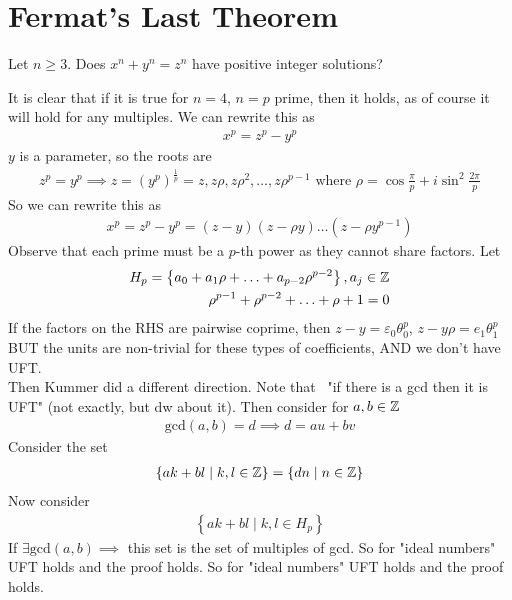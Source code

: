 \documentclass{memoir}
\begin{document}
\section{Fermat's Last Theorem}
\label{sec:fermat_s_last_theorem}
\begin{thm}
	Let \(n\geq 3\). Does \(x^{n}+y^{n}=z^{n}\) have positive integer solutions?
\end{thm}
It is clear that if it is true for \(n  = 4\), \(n= p\) prime, then it holds, as of course it will hold for any multiples. We can rewrite this as
\begin{align*}
	x^{p} = z^{p}-y^{p}
\end{align*}
\(y\) is a parameter, so the roots are
\begin{align*}
	z^{p} = y^{p} \implies z = (y^{p})^{\frac{1}{p}} = z, z\rho, z\rho^2,\ldots,z\rho^{p-1} \text{ where } \rho = \cos \frac{\pi}{p} + i \sin^2 \frac{2\pi}{p}
\end{align*}
So we can rewrite this as
\begin{align*}
	x^{p} = z^{p}-y^{p} = (z-y)(z-\rho y)\ldots(z-\rho y^{p-1})
\end{align*}
Observe that each prime must be a \(p\)-th power as they cannot share factors. Let
\begin{align*}
	H_p = \left\{ a_0 + a_1\rho + \ldots + a_{p-2}\rho^{p-2} \right\}, a_j \in \mathbb{Z} \\
	\rho^{p-1}+\rho^{p-2} + \ldots + \rho + 1 = 0
\end{align*}
If the factors on the RHS are pairwise coprime, then \(z-y = \varepsilon_0 \theta_0^{p}\), \(z-y\rho = e_1 \theta_1^{p}\)
BUT the units are non-trivial for these types of coefficients, AND we don't have UFT.\\

Then Kummer did a different direction. Note that ~"if there is a gcd then it is UFT" (not exactly, but dw about it). Then consider for \(a,b \in \mathbb{Z}\)
\begin{align*}
	\textrm{gcd}(a,b) = d \implies d = au + bv
\end{align*}
Consider the set
\begin{align*}
	\left\{ak + bl \mid k,l \in \mathbb{Z} \right\} = \left\{dn \mid n \in \mathbb{Z} \right\} 
\end{align*}
Now consider
\begin{align*}
	\left\{ak + bl \mid k,l \in H_p \right\} 
\end{align*}
If \( \exists \textrm{gcd}(a,b) \implies\) this set is the set of multiples of gcd. So for "ideal numbers" UFT holds and the proof holds. So for "ideal numbers" UFT holds and the proof holds.
\end{document}
